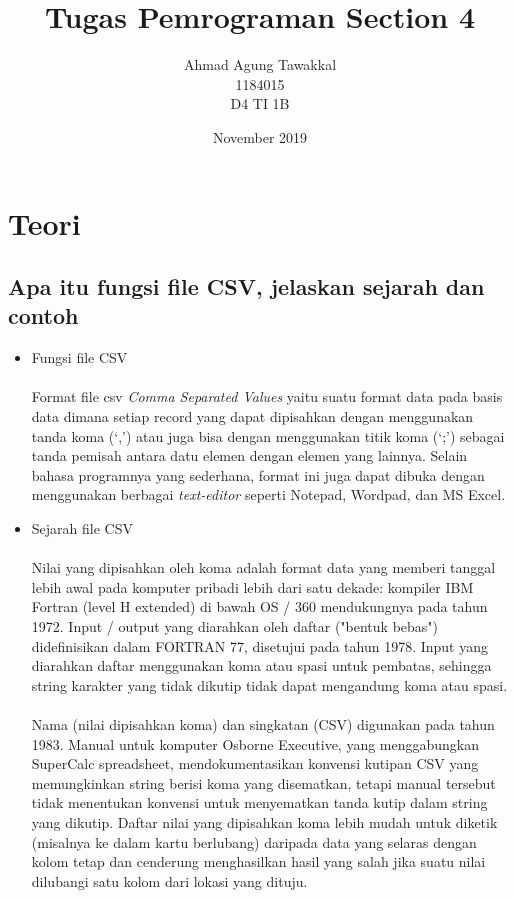 \documentclass{article}
\title{Tugas Pemrograman Section 4}
\author{Ahmad Agung Tawakkal\\
        1184015\\
        D4 TI 1B}
\date{November 2019}
\begin{document}
\maketitle

\newpage


\section{Teori}
    \subsection{Apa itu fungsi file CSV, jelaskan sejarah dan contoh}
        \begin{itemize}
            \item Fungsi file CSV
                \paragraph{}Format file csv \textit{Comma Separated Values} yaitu suatu format data pada basis data dimana setiap record yang dapat dipisahkan dengan menggunakan tanda koma (`,’) atau juga bisa dengan menggunakan titik koma (`;’) sebagai tanda pemisah antara datu elemen dengan elemen yang lainnya. Selain bahasa programnya yang sederhana, format ini juga dapat dibuka dengan menggunakan berbagai \textit{text-editor} seperti Notepad, Wordpad, dan MS Excel.
            \item Sejarah file CSV
                \paragraph{} Nilai yang dipisahkan oleh koma adalah format data yang memberi tanggal lebih awal pada komputer pribadi lebih dari satu dekade: kompiler IBM Fortran (level H extended) di bawah OS / 360 mendukungnya pada tahun 1972. Input / output yang diarahkan oleh daftar ("bentuk bebas") didefinisikan dalam FORTRAN 77, disetujui pada tahun 1978. Input yang diarahkan daftar menggunakan koma atau spasi untuk pembatas, sehingga string karakter yang tidak dikutip tidak dapat mengandung koma atau spasi.
                \paragraph{}Nama (nilai dipisahkan koma) dan singkatan (CSV) digunakan pada tahun 1983. Manual untuk komputer Osborne Executive, yang menggabungkan SuperCalc spreadsheet, mendokumentasikan konvensi kutipan CSV yang memungkinkan string berisi koma yang disematkan, tetapi manual tersebut tidak menentukan konvensi untuk menyematkan tanda kutip dalam string yang dikutip. Daftar nilai yang dipisahkan koma lebih mudah untuk diketik (misalnya ke dalam kartu berlubang) daripada data yang selaras dengan kolom tetap dan cenderung menghasilkan hasil yang salah jika suatu nilai dilubangi satu kolom dari lokasi yang dituju.

\end{itemize}
\end{document}
